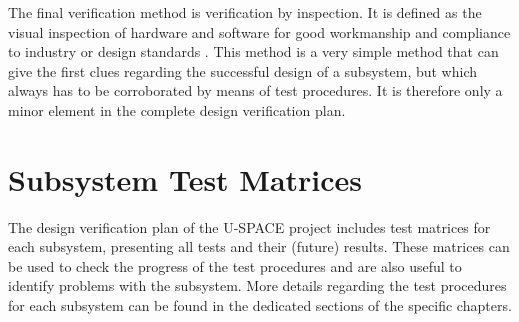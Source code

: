 The final verification method is verification by inspection. It is defined as the visual inspection of hardware and software for good workmanship and compliance to industry or design standards \cite{ECSS_verification}. This method is a very simple method that can give the first clues regarding the successful design of a subsystem, but which always has to be corroborated by means of test procedures. It is therefore only a minor element in the complete design verification plan.

\section{Subsystem Test Matrices}

The design verification plan of the \ac{U-SPACE} project includes test matrices for each subsystem, presenting all tests and their (future) results. These matrices can be used to check the progress of the test procedures and are also useful to identify problems with the subsystem. More details regarding the test procedures for each subsystem can be found in the dedicated sections of the specific chapters.

